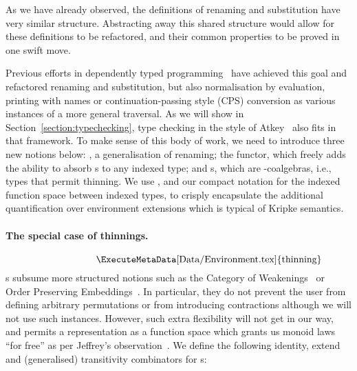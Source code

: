 As we have already observed, the definitions of renaming and substitution have very
similar structure. Abstracting away this shared structure would allow for these
definitions to be refactored, and their common properties to be proved in one swift
move.

Previous efforts in dependently typed
programming~\cite{benton2012strongly,allais2017type}
have achieved this goal and refactored renaming and substitution,
but also normalisation by evaluation, printing with names or continuation-passing style (CPS) conversion
as various instances of a more general traversal. As we will show in Section~\ref{section:typechecking},
type checking in the style of Atkey~\citeyear{atkey2015algebraic} also
fits in that framework. To make sense of this body of work, we
need to introduce three new notions below: , a generalisation of
renaming; the
 functor, which freely adds the ability to absorb s to any indexed type; and s, which are -coalgebras, i.e., types that permit thinning.
We use , and our compact notation for the indexed function space
between indexed types, to crisply encapsulate the additional quantification
over environment extensions which is typical of Kripke semantics.

\paragraph{The special case of thinnings.}
\begin{displaymath}
  \begin{minipage}{0.5\linewidth}
    \ExecuteMetaData[Data/Environment.tex]{thinning}
  \end{minipage}
\end{displaymath}
s subsume more structured notions such as the Category of
Weakenings~\cite{altenkirch1995categorical} or Order Preserving
Embeddings~\cite{chapman2009type}. In particular, they do not prevent the
user from defining arbitrary permutations or from introducing contractions
although we will not use such instances. However, such extra flexibility
will not get in our way, and permits a representation as a function space
which grants us monoid laws ``for free'' as per Jeffrey's
observation~\citeyear{jeffrey2011assoc}. We define the following identity, extend and (generalised) transitivity combinators for s:
\begin{center}
\begin{minipage}{0.45\textwidth}
\end{minipage}
\begin{minipage}{0.45\textwidth}
\end{minipage}
\end{center}


